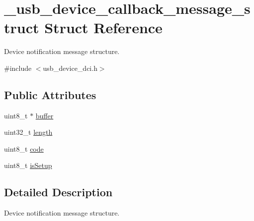 \hypertarget{struct__usb__device__callback__message__struct}{\section{\-\_\-usb\-\_\-device\-\_\-callback\-\_\-message\-\_\-struct Struct Reference}
\label{struct__usb__device__callback__message__struct}
}


Device notification message structure.  




{\ttfamily \#include $<$usb\-\_\-device\-\_\-dci.\-h$>$}

\subsection*{Public Attributes}
\begin{DoxyCompactItemize}
\item 
uint8\-\_\-t $\ast$ \hyperlink{struct__usb__device__callback__message__struct_adff2b0d4cadc686699c367705b7127f6}{buffer}
\item 
uint32\-\_\-t \hyperlink{struct__usb__device__callback__message__struct_aae817b0dc7d1f8394024910412caba31}{length}
\item 
uint8\-\_\-t \hyperlink{struct__usb__device__callback__message__struct_ada4df9e2414e192bfd8c4d27fe1596ee}{code}
\item 
uint8\-\_\-t \hyperlink{struct__usb__device__callback__message__struct_a241d466ac120fe60cad47ca2c84e5a29}{is\-Setup}
\end{DoxyCompactItemize}


\subsection{Detailed Description}
Device notification message structure. 


